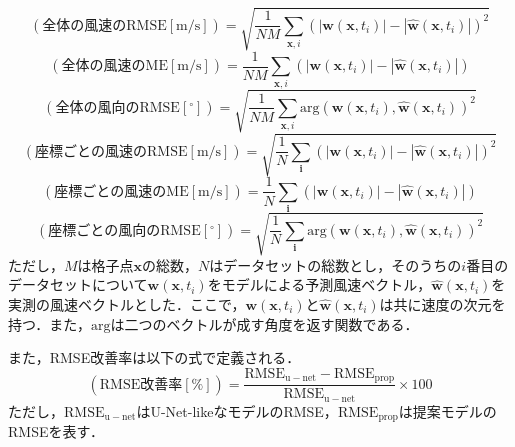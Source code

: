 \begin{equation}
  (\mathrm{全体の風速のRMSE [m/s]}) = \sqrt{\frac{1}{NM} \sum_{\bm{x}, i} (|\bm{w}(\bm{x}, t_i)| - |\hat{\bm{w}}(\bm{x}, t_i)|)^2}
  \label{eq:exp-rmse}
\end{equation}
\begin{equation}
  (\mathrm{全体の風速のME [m/s]}) = \frac{1}{NM} \sum_{\bm{x}, i} (|\bm{w}(\bm{x}, t_i)| - |\hat{\bm{w}}(\bm{x}, t_i)|)
  \label{eq:exp-me}
\end{equation}
\begin{equation}
  (\mathrm{全体の風向のRMSE [^\circ]}) = \sqrt{\frac{1}{NM} \sum_{\bm{x}, i} \mathrm{arg}(\bm{w}(\bm{x}, t_i), \hat{\bm{w}}(\bm{x}, t_i))^2}
  \label{eq:exp-rmse-direction}
\end{equation}
\begin{equation}
  (\mathrm{座標ごとの風速のRMSE [m/s]}) = \sqrt{\frac{1}{N} \sum_{\bm{i}} (|\bm{w}(\bm{x}, t_i)| - |\hat{\bm{w}}(\bm{x}, t_i)|)^2}
  \label{eq:exp-rmse-per-point}
\end{equation}
\begin{equation}
  (\mathrm{座標ごとの風速のME [m/s]}) = \frac{1}{N} \sum_{\bm{i}} (|\bm{w}(\bm{x}, t_i)| - |\hat{\bm{w}}(\bm{x}, t_i)|)
  \label{eq:exp-me-per-point}
\end{equation}
\begin{equation}
  (\mathrm{座標ごとの風向のRMSE [^\circ]}) = \sqrt{\frac{1}{N} \sum_{\bm{i}} \mathrm{arg}(\bm{w}(\bm{x}, t_i), \hat{\bm{w}}(\bm{x}, t_i))^2}
  \label{eq:exp-rmse-direction-per-point}
\end{equation}
ただし，$M$は格子点$\bm{x}$の総数，$N$はデータセットの総数とし，そのうちの$i$番目のデータセットについて$\bm{w}(\bm{x}, t_i)$をモデルによる予測風速ベクトル，$\hat{\bm{w}}(\bm{x}, t_i)$を実測の風速ベクトルとした．ここで，$\bm{w}(\bm{x}, t_i)$と$\hat{\bm{w}}(\bm{x}, t_i)$は共に速度の次元を持つ．また，$\mathrm{arg}$は二つのベクトルが成す角度を返す関数である．

また，RMSE改善率は以下の式で定義される．
\begin{equation}
  (\mathrm{RMSE改善率 [\%]}) = \frac{\mathrm{RMSE_{u-net}} - \mathrm{RMSE_{prop}}}{\mathrm{RMSE_{u-net}}} \times 100
  \label{eq:exp-rmse-improvement-rate}
\end{equation}
ただし，$\mathrm{RMSE_{u-net}}$はU-Net-likeなモデルのRMSE，$\mathrm{RMSE_{prop}}$は提案モデルのRMSEを表す．


